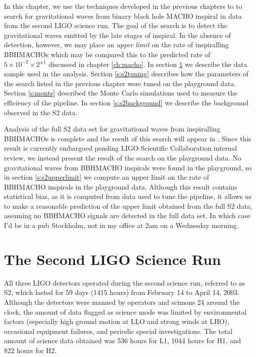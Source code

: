 
In this chapter, we use the techniques developed in the previous chapters to
to search for gravitational waves from binary black hole MACHO inspiral in
data from the second LIGO science run.  The goal of the search is to detect
the gravitational waves emitted by the late stages of inspiral. In the absence
of detection, however, we may place an \emph{upper limit} on the rate of
inspiralling BBHMACHOs which may be compared this to the predicted rate of $5
\times 10^{-2} \times 2^{\pm 1}$ discussed in chapter \ref{ch:macho}.  In
section \ref{s:s2run} we describe the data sample used in the analysis.
Section \ref{s:s2tuning} describes how the parameters of the search listed in
the previous chapter were tuned on the playground data. Section \ref{s:monte}
described the Monte Carlo simulations used to measure the efficiency of the
pipeline. In section \ref{s:s2background} we describe the background
observed in the S2 data.

Analysis of the full S2 data set for gravitational waves from inspiralling
BBHMACHOs is complete and the result of this search will appear in
\cite{S2Macho:2004}. Since this result is currently embargoed pending LIGO
Scientific Collaboration internal review, we instead present the result of the
search on the playground data. No gravitational waves from BBHMACHO inspirals
were found in the playground, so in section \ref{s:s2upperlimit} we compute
an upper limit on the rate of BBHMACHO inspirals in the playground data.
Although this result contains statistical bias, as it is computed from data
used to tune the pipeline, it allows us to make a reasonable prediction of the
upper limit obtained from the full S2 data, assuming no BBHMACHO signals are
detected in the full data set. In which case I'd be in a pub Stockholm, not in
my office at 2am on a Wednesday morning.

\section{The Second LIGO Science Run}
\label{s:s2run}

All three LIGO detectors operated during the second science run, referred to
as S2, which lasted for 59 days (1415 hours) from February 14 to April 14,
2003.  Although the detectors were manned by operators and scimons 24 around
the clock, the amount of data flagged as science mode was limited by
environmental factors (especially high ground motion at LLO and strong winds
at LHO), occasional equipment failures, and periodic special investigations.
The total amount of science data obtained was 536 hours for L1, 1044 hours for
H1, and 822 hours for H2.

